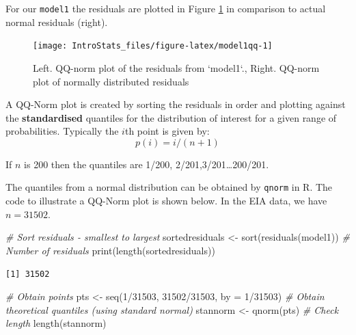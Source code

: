 \documentclass[
  oneside]{krantz}
\newenvironment{Shaded}{\begin{snugshade}}{\end{snugshade}}
\newcommand{\AttributeTok}[1]{\textcolor[rgb]{0.77,0.63,0.00}{#1}}
\newcommand{\CommentTok}[1]{\textcolor[rgb]{0.56,0.35,0.01}{\textit{#1}}}
\newcommand{\DecValTok}[1]{\textcolor[rgb]{0.00,0.00,0.81}{#1}}
\newcommand{\FunctionTok}[1]{\textcolor[rgb]{0.00,0.00,0.00}{#1}}
\newcommand{\NormalTok}[1]{#1}
\newcommand{\OtherTok}[1]{\textcolor[rgb]{0.56,0.35,0.01}{#1}}
\newcommand{\SpecialCharTok}[1]{\textcolor[rgb]{0.00,0.00,0.00}{#1}}
\begin{document}
For our \texttt{model1} the residuals are plotted in Figure \ref{fig:model1qq} in comparison to actual normal residuals (right).

\begin{figure}

{\centering \texttt{[image: IntroStats\_files/figure-latex/model1qq-1]} 

}

\caption{Left. QQ-norm plot of the residuals from `model1`., Right. QQ-norm plot of normally distributed residuals}\label{fig:model1qq}
\end{figure}

A QQ-Norm plot is created by sorting the residuals in order and plotting against the \textbf{standardised} quantiles for the distribution of interest for a given range of probabilities. Typically the \(i\)th point is given by:
\[p(i) = i/(n+1)\]

If \(n\) is 200 then the quantiles are 1/200, 2/201,3/201\ldots200/201.

The quantiles from a normal distribution can be obtained by \texttt{qnorm} in R. The code to illustrate a QQ-Norm plot is shown below. In the EIA data, we have \(n = 31502\).

\begin{Shaded}
\begin{Highlighting}[]
\CommentTok{\# Sort residuals {-} smallest to largest}
\NormalTok{sortedresiduals }\OtherTok{\textless{}{-}} \FunctionTok{sort}\NormalTok{(}\FunctionTok{residuals}\NormalTok{(model1))}
\CommentTok{\# Number of residuals}
\FunctionTok{print}\NormalTok{(}\FunctionTok{length}\NormalTok{(sortedresiduals))}
\end{Highlighting}
\end{Shaded}

\begin{verbatim}
[1] 31502
\end{verbatim}

\begin{Shaded}
\begin{Highlighting}[]
\CommentTok{\# Obtain points }
\NormalTok{pts }\OtherTok{\textless{}{-}} \FunctionTok{seq}\NormalTok{(}\DecValTok{1}\SpecialCharTok{/}\DecValTok{31503}\NormalTok{, }\DecValTok{31502}\SpecialCharTok{/}\DecValTok{31503}\NormalTok{, }\AttributeTok{by =} \DecValTok{1}\SpecialCharTok{/}\DecValTok{31503}\NormalTok{)}
\CommentTok{\# Obtain theoretical quantiles (using standard normal)}
\NormalTok{stannorm }\OtherTok{\textless{}{-}} \FunctionTok{qnorm}\NormalTok{(pts)}
\CommentTok{\# Check length}
\FunctionTok{length}\NormalTok{(stannorm)}
\end{Highlighting}
\end{Shaded}
\end{document}
